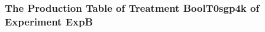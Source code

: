  \begin{frame}
 \fontsize{8pt}{9pt}\selectfont
 \frametitle{ The Production Table of Treatment BoolT0sgp4k of Experiment ExpB }

 \label{ExpBGrammarTable002.tex}  
 \end{frame}

